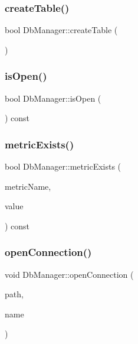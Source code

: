 \subsubsection{\texorpdfstring{create\+Table()}{createTable()}}
{\footnotesize\ttfamily bool Db\+Manager\+::create\+Table (\begin{DoxyParamCaption}{ }\end{DoxyParamCaption})}

\mbox{\label{class_db_manager_ac04baba8f5d5197f8bcd9230393501de}} 
\subsubsection{\texorpdfstring{is\+Open()}{isOpen()}}
{\footnotesize\ttfamily bool Db\+Manager\+::is\+Open (\begin{DoxyParamCaption}{ }\end{DoxyParamCaption}) const}

\mbox{\label{class_db_manager_a2a88468ac169883b9f77cfcf3ec853c9}} 
\subsubsection{\texorpdfstring{metric\+Exists()}{metricExists()}}
{\footnotesize\ttfamily bool Db\+Manager\+::metric\+Exists (\begin{DoxyParamCaption}\item[{Q\+String}]{metric\+Name,  }\item[{const Q\+String \&}]{value }\end{DoxyParamCaption}) const}

\mbox{\label{class_db_manager_a0d30e17db55d9a545b648b58d38409b6}} 
\subsubsection{\texorpdfstring{open\+Connection()}{openConnection()}}
{\footnotesize\ttfamily void Db\+Manager\+::open\+Connection (\begin{DoxyParamCaption}\item[{Q\+String}]{path,  }\item[{Q\+String}]{name }\end{DoxyParamCaption})}

